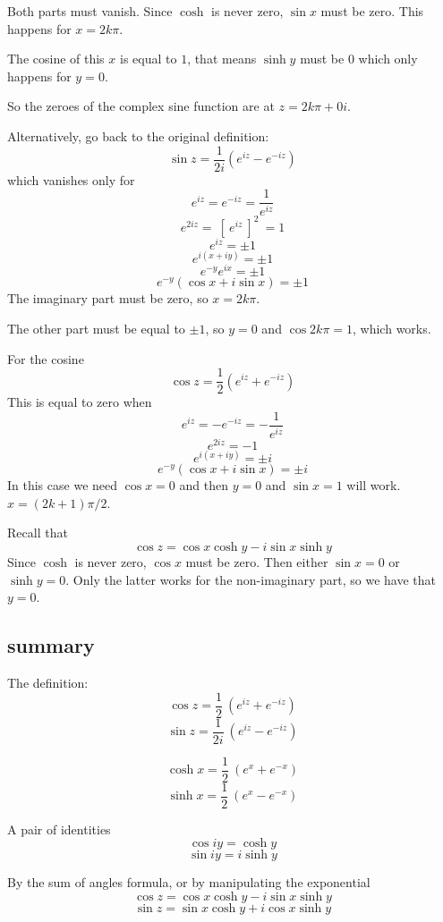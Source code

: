 \documentclass[11pt, oneside]{article}
\begin{document}
Both parts must vanish.  Since $\cosh$ is never zero, $\sin x$ must be zero.  This happens for $x = 2k \pi$.  

The cosine of this $x$ is equal to $1$, that means $\sinh y$ must be $0$ which only happens for $y = 0$.

So the zeroes of the complex sine function are at $z = 2k \pi + 0i$.

Alternatively, go back to the original definition:
\[ \sin z = \frac{1}{2i} (e^{iz} - e^{-iz}) \]
which vanishes only for 
\[ e^{iz} = e^{-iz} = \frac{1}{e^{iz}} \]
\[ e^{2iz} = \ [ \ e^{iz} \ ]^2 \ = 1 \]
\[ e^{iz} = \pm 1 \]
\[ e^{i(x + iy)} = \pm 1 \]
\[ e^{-y}e^{ix} = \pm 1 \]
\[ e^{-y} (\cos x + i \sin x) = \pm 1 \]
The imaginary part must be zero, so $x = 2k \pi$.

The other part must be equal to $\pm 1$, so $y = 0$ and $\cos 2k \pi = 1$, which works.

For the cosine
\[ \cos z = \frac{1}{2} (e^{iz} + e^{-iz}) \]
This is equal to zero when
\[ e^{iz} = - e^{-iz} = -\frac{1}{e^{iz}} \]
\[ e^{2iz} = -1 \]
\[ e^{i(x + iy)} = \pm i \]
\[ e^{-y} (\cos x + i \sin x) = \pm i \]
In this case we need $\cos x = 0$ and then $y=0$ and $\sin x = 1$ will work.  $x = (2k + 1)\pi / 2$.

Recall that
\[ \cos z = \cos x \cosh y - i \sin x \sinh y \]
Since $\cosh$ is never zero, $\cos x$ must be zero.  Then either $\sin x = 0$ or $\sinh y = 0$.  Only the latter works for the non-imaginary part, so we have that $y = 0$.

\subsection*{summary}

The definition:
\[ \cos z = \frac{1}{2} \ (e^{iz} + e^{-iz}) \]
\[ \sin z = \frac{1}{2i} \ (e^{iz} - e^{-iz}) \]

\[ \cosh x =  \frac{1}{2} \ (e^{x}+ e^{-x}) \]
\[ \sinh x =  \frac{1}{2} \ (e^{x} - e^{-x}) \]

A pair of identities
\[ \cos iy = \cosh y \]
\[ \sin iy =  i \sinh y \]

By the sum of angles formula, or by manipulating the exponential
\[ \cos z = \cos x \cosh y - i \sin x \sinh y \]
\[ \sin z = \sin x \cosh y + i \cos x \sinh y \]
\end{document}
